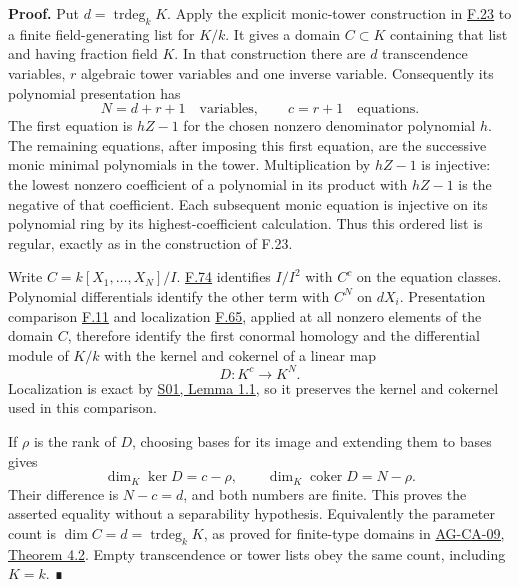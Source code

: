 \documentclass[11pt,a4paper,openany]{report}
\begin{document}
\textbf{Proof.} Put \(d=\operatorname{trdeg}_k K\). Apply the explicit monic-tower construction in \hyperref[AG-RG-S05-algebra-lemma-colimit-syntomic]{F.23} to a finite field-generating list for \(K/k\). It gives a domain \(C\subset K\) containing that list and having fraction field \(K\). In that construction there are \(d\) transcendence variables, \(r\) algebraic tower variables and one inverse variable. Consequently its polynomial presentation has \[
N=d+r+1\quad\text{variables},\qquad c=r+1\quad\text{equations}.
\] The first equation is \(hZ-1\) for the chosen nonzero denominator polynomial \(h\). The remaining equations, after imposing this first equation, are the successive monic minimal polynomials in the tower. Multiplication by \(hZ-1\) is injective: the lowest nonzero coefficient of a polynomial in its product with \(hZ-1\) is the negative of that coefficient. Each subsequent monic equation is injective on its polynomial ring by its highest-coefficient calculation. Thus this ordered list is regular, exactly as in the construction of F.23.

Write \(C=k[X_1,\ldots,X_N]/I\). \hyperref[AG-RG-S05-algebra-lemma-regular-quasi-regular]{F.74} identifies \(I/I^2\) with \(C^c\) on the equation classes. Polynomial differentials identify the other term with \(C^N\) on \(dX_i\). Presentation comparison \hyperref[AG-RG-S05-algebra-lemma-NL-homotopy]{F.11} and localization \hyperref[AG-RG-S05-algebra-lemma-localize-NL]{F.65}, applied at all nonzero elements of the domain \(C\), therefore identify the first conormal homology and the differential module of \(K/k\) with the kernel and cokernel of a linear map \[
D:K^c\longrightarrow K^N.
\] Localization is exact by \href{https://github.com/KokunoYumeto/open-math-courses/blob/main/docs/courses/AG-RG/AG-RG-S01.md}{S01, Lemma 1.1}, so it preserves the kernel and cokernel used in this comparison.

If \(\rho\) is the rank of \(D\), choosing bases for its image and extending them to bases gives \[
\dim_K\ker D=c-\rho,\qquad
\dim_K\operatorname{coker}D=N-\rho.
\] Their difference is \(N-c=d\), and both numbers are finite. This proves the asserted equality without a separability hypothesis. Equivalently the parameter count is \(\dim C=d=\operatorname{trdeg}_k K\), as proved for finite-type domains in \href{https://github.com/KokunoYumeto/open-math-courses/blob/d02d0a3669f42579db037cd44de1d113fdd770a1/docs/courses/AG-CA/src/krull-dimension-and-noether-normalization.md}{AG-CA-09, Theorem 4.2}. Empty transcendence or tower lists obey the same count, including \(K=k\). ∎
\end{document}
